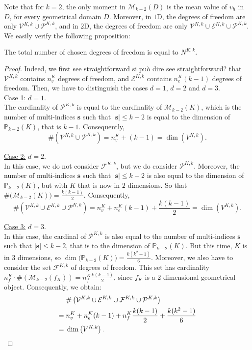 \noindent Note that for $k=2$, the only moment in $\mathcal{M}_{k-2}(D)$ is the mean value of $v_h$ in $D$, for every geometrical domain $D$.  Moreover, in $1$D, the degrees of freedom are only $\mathcal{V}^{K,k}\cup\mathcal{P}^{K,k}$, and in $2$D, the degrees of freedom are only $\mathcal{V}^{K,k}\cup\mathcal{E}^{K,k} \cup\mathcal{P}^{K,k}$.
We easily verify the following proposition:
\begin{proposition} \label{chosenlocaldofnb}
The total number of chosen degrees of freedom is equal to $N^{K,k}$. 
\end{proposition}
\begin{proof}
Indeed, we first see straightforward {\color{red} si può dire see straightforward?} that $\mathcal{V}^{K,k}$ contains $n_v^K$ degrees of freedom, and $\mathcal{E}^{K,k}$ contains $n_e^K(k-1)$ degrees of freedom. Then, we have to distinguish the cases $d=1$, $d=2$ and $d=3$. \\

\noindent \underline{Case 1:} $d=1$. \\
\noindent The cardinality of $\mathcal{P}^{K,k}$ is equal to the cardinality of $\mathcal{M}_{k-2}(K)$, which is the number of multi-indices $\mathbf{s}$ such that $|\mathbf{s}|\leq k-2$ is equal to the dimension of $\mathbb{P}_{k-2}(K)$, that is $k-1$. Consequently, 
$$\#\left(\mathcal{V}^{K,k} \cup\mathcal{P}^{K,k}\right)=n_v^K
+(k-1)= \dim\left(V^{K,k}\right).
$$

\noindent \underline{Case 2:} $d=2$.\\
\noindent In this case, we do not consider $\mathcal{F}^{K,k}$, but we do consider $\mathcal{P}^{K,k}$. Moreover, the number of multi-indices $\mathbf{s}$ such that $|\mathbf{s}|\leq k-2$ is also equal to the dimension of $\mathbb{P}_{k-2}(K)$, but with $K$ that is now in $2$ dimensions. So that $\#\big(\mathcal{M}_{k-2}(K)\big) = \frac{k(k-1)}{2}$. Consequently, 
$$\#\left(\mathcal{V}^{K,k}\cup \mathcal{E}^{K,k} \cup\mathcal{P}^{K,k}\right)=n_v^K
+ n_e^K(k-1) + \frac{k(k-1)}{2}= \dim\left(V^{K,k}\right).
$$

\noindent \underline{Case 3:} $d=3$.\\
\noindent In this case, the cardinal of $\mathcal{P}^{K,k}$ is also equal to the number of multi-indices $\mathbf{s}$ such that $|\mathbf{s}|\leq k-2$, that is to the dimension of $\mathbb{P}_{k-2}(K)$. But this time, $K$ is in $3$ dimensions, so $\dim\big(\mathbb{P}_{k-2}(K)\big) = \frac{k(k^2-1)}{6}.$ Moreover, we also have to consider the set $\mathcal{F}^{K,k}$ of degrees of freedom. This set has cardinality $n_f^K\cdot\#\left(\mathcal{M}_{k-2}(f_K)\right) = n_f^K\frac{k(k-1)}{2}$, since $f_K$ is a $2$-dimensional geometrical object. Consequently, we obtain:
\begin{align*}
&\#\left(\mathcal{V}^{K,k}\cup \mathcal{E}^{K,k}\cup\mathcal{F}^{K,k} \cup\mathcal{P}^{K,k}\right)\\
= \hspace{1mm}&n_v^K
+ n_e^K(k-1) + n_f^K\frac{k(k-1)}{2} + \frac{k(k^2-1)}{6}\\
= \hspace{1mm}&\dim\left(V^{K,k}\right).
\end{align*}
\end{proof}

